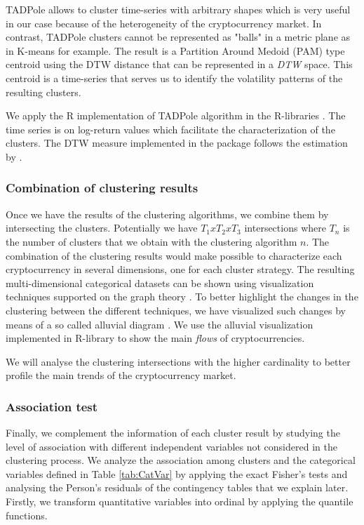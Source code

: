 \documentclass{bmcart}
\begin{document}
TADPole allows to cluster time-series with arbitrary shapes which is very useful in our case because of the heterogeneity  of the cryptocurrency market. In contrast, TADPole clusters cannot be represented as "balls"  in a metric plane as in K-means for example. The result is a Partition Around Medoid (PAM) type centroid using the DTW distance that can be represented in a \textit{DTW} space. This centroid is a time-series that serves us to identify the volatility patterns of the resulting clusters.

We apply the R implementation of TADPole algorithm in the R-libraries \cite{DTWCLUST, DTWCLUST2}. The time series is on  log-return values which facilitate the characterization of the clusters. The DTW measure implemented in the package follows the estimation by \cite{Lemire2008}. 

\subsubsection*{Combination of clustering results}\label{sub:ClusteringEnsem}

Once we have the results of the clustering algorithms, we combine them by intersecting the clusters. Potentially we have $T_1 x T_2 x T_3$ intersections where $T_n$ is the number of clusters that we obtain with the clustering algorithm $n$.
The combination of the clustering results would make possible to characterize each cryptocurrency in several dimensions, one for each cluster strategy. The resulting multi-dimensional categorical datasets can be shown  using visualization techniques supported on the graph theory \cite{l2015xclusim, kern2017interactive}. To better highlight the changes in the clustering between the different techniques, we have visualized such changes by means of a so called alluvial diagram \cite{Rosvall2010MappingCI}. We use the alluvial visualization  implemented in R-library \cite{alluvial2016} to show the main \textit{flows} of cryptocurrencies.

We will analyse the clustering intersections with the higher cardinality to better profile the main trends of the cryptocurrency market.


\subsubsection*{Association test}

Finally, we complement the information of each cluster result by studying the level of association with different independent variables not considered in the clustering process. We analyze the association among clusters and the categorical variables defined in Table \ref{tab:CatVar} by applying the exact Fisher's tests and analysing the Person's residuals of the contingency tables that we explain later. Firstly, we transform quantitative variables into ordinal by applying the quantile functions.\\
\end{document}
